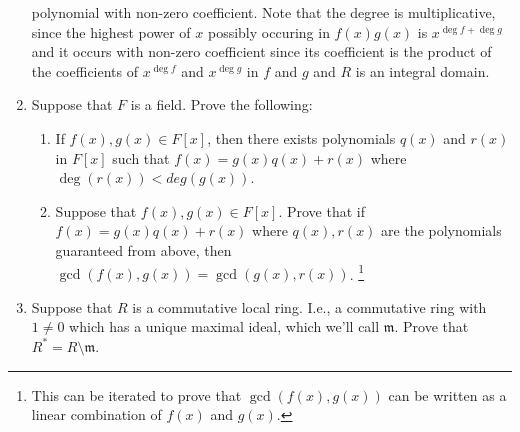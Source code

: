 \documentclass[12pt]{article}
\newcommand{\solution}[1]{\textcolor{red}{#1}}
\renewcommand{\solution}[1]{}
\begin{document}
\begin{enumerate}
{polynomial with non-zero coefficient. Note that the degree is
multiplicative, since the highest power of $x$ possibly occuring in $f(x)g(x)$
is $x^{\deg f+\deg g}$ and it occurs with non-zero coefficient since
its coefficient is the product of the coefficients of $x^{\deg f}$ and
$x^{\deg g}$ in $f$ and $g$ and $R$ is an integral domain. 
}
\item Suppose that $F$ is a field. Prove the following:
  \begin{enumerate}
  \item If $f(x),g(x)\in F[x]$, then there exists polynomials $q(x)$
    and $r(x)$ in $F[x]$ such that $f(x)=g(x)q(x)+r(x)$ where
    $\deg(r(x))<deg(g(x))$. 
\solution{
If $\deg f(x)<\deg g(x)$, then $q(x)=0$ and $r(x)=f(x)$
work. Otherwise, suppose that $f(x)=\sum\limits_{i=0}^N a_i x^i$ and
$g(x)=\sum\limits_{i=0}^M b_i x^i$ so that $a_N\neq 0$ and $b_M\neq
0$.  Then
\[f(x)-\left(\frac{a_N}{b_M}x^{N-M}\right) g(x)\] is a polynomial of
degree $N-1$. If $N=M$, then take this resulting polynomial to be
$r(x)$. So $f(x)=\left(\frac{a_N}{b_M}x^{N-M}\right) g(x)+r(x)$ and
$\deg r(x)<M$. If $N>M$, then by induction
$f(x)-\left(\frac{a_N}{b_M}x^{N-M}\right) g(x)=g(x)q(x)+r(x)$ for some
polynomial $r(x)$ of degree less than $M$. Hence, $f(x) =
g(x)\left[q(x)+\left(\frac{a_N}{b_M}x^{N-M}\right)x^{N-M}\right]+r(x)$
and $\deg r(x)<M$. 
}
  \item Suppose that $f(x),g(x)\in F[x]$. Prove that if
    $f(x)=g(x)q(x)+r(x)$ where $q(x),r(x)$ are the polynomials
    guaranteed from above, then
    $\gcd(f(x),g(x))=\gcd(g(x),r(x))$. \footnote{This can be iterated
      to prove that $\gcd(f(x),g(x))$ can be written as a linear
      combination of $f(x)$ and $g(x)$. }
\solution{Suppose that $d(x) \mid f(x)$ and $d(x)\mid g(x)$. But
  $r(x)=f(x)-g(x)q(x)$, so $d(x)$ divides $r(x)$. Now suppose that
  $h(x)$ divides $g(x), r(x)$. Then clearly $h(x)$ dividies
  $f(x)$. Hence, the set of divisors of $f(x)$ and $g(x)$ is the set
  as the set of divisors of $g(x),r(x)$. Thus, their maximal elements
  are equal.
}
  \end{enumerate}
\item Suppose that $R$ is a commutative local ring. I.e., a
  commutative ring with
  $1\neq 0$ which
  has a unique maximal ideal, which we'll call $\mathfrak{m}$. Prove
  that $R^* = R\setminus \mathfrak{m}$. 
\solution{Suppose that $x\in R\setminus \mathfrak{m}$, and take $(x)$
  the ideal generated by $x$. Since $x\notin \mathfrak{m}$,
  $(x)\not\subset \mathfrak{m}$. But $\mathfrak{m}$ contains all
}
\end{enumerate}
\end{document}
